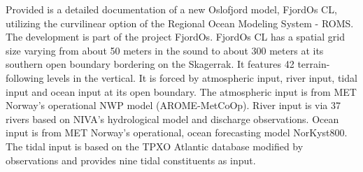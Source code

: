 Provided is a detailed documentation of a new Oslofjord model, FjordOs CL, utilizing the curvilinear option of the Regional Ocean Modeling System - ROMS. The development is part of the project FjordOs. FjordOs CL has a spatial grid size varying from about 50 meters in the {\DR} sound to about 300 meters at its southern open boundary bordering on the Skagerrak. It features 42 terrain-following levels in the vertical. It is forced by atmospheric input, river input, tidal input and ocean input at its open boundary. The atmospheric input is from MET Norway's operational NWP model (AROME-MetCoOp). River input is via 37 rivers based on NIVA's hydrological model and discharge observations. Ocean input is from MET Norway's operational, ocean forecasting model NorKyst800. The tidal input is based on the TPXO Atlantic database modified by observations and provides nine tidal constituents as input.
